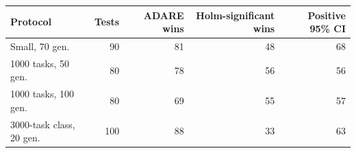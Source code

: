 \begin{tabular}{lrrrr}
\toprule
Protocol & Tests & ADARE wins & Holm-significant wins & Positive 95\% CI \\
\midrule
Small, 70 gen. & 90 & 81 & 48 & 68 \\
1000 tasks, 50 gen. & 80 & 78 & 56 & 56 \\
1000 tasks, 100 gen. & 80 & 69 & 55 & 57 \\
3000-task class, 20 gen. & 100 & 88 & 33 & 63 \\
\bottomrule
\end{tabular}
